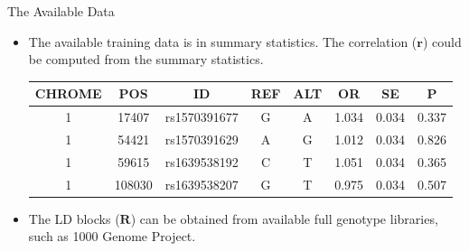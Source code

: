 \documentclass{beamer}
\begin{document}
\begin{frame}{The Available Data}

\begin{itemize}
    \item The available training data is in summary statistics.  The correlation ($\boldsymbol{r}$) could be computed from the summary statistics.
    
    \begin{table}[h]
    \centering
    \tiny
    \begin{tabular}{|c c c c c c c c|} 
    \hline
       CHROME & POS & ID & REF & ALT & OR & SE & P\\ [0.5ex]
    \hline
    1 & 17407 & rs1570391677 & G & A & 1.034 & 0.034 & 0.337 \\
    1 & 54421 & rs1570391629 & A & G & 1.012 & 0.034 & 0.826 \\
    1 & 59615 & rs1639538192 & C & T & 1.051 & 0.034 & 0.365 \\
    1 & 108030 & rs1639538207 & G & T & 0.975 & 0.034 & 0.507 \\
    \hline
    \end{tabular}
    \end{table}
    \item The LD blocks ($\boldsymbol{R}$) can be obtained from available full genotype libraries, such as 1000 Genome Project.
\end{itemize}
    
\end{frame}
\end{document}
